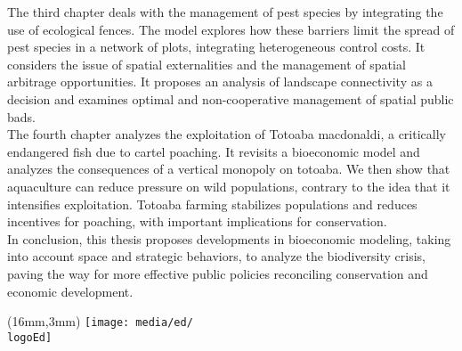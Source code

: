 {The third chapter deals with the management of pest species by integrating the use of ecological fences. The model explores how these barriers limit the spread of pest species in a network of plots, integrating heterogeneous control costs. It considers the issue of spatial externalities and the management of spatial arbitrage opportunities. It proposes an analysis of landscape connectivity as a decision and examines optimal and non-cooperative management of spatial public bads. \\

The fourth chapter analyzes the exploitation of Totoaba macdonaldi, a critically endangered fish due to cartel poaching. It revisits a bioeconomic model and analyzes the consequences of a vertical monopoly on totoaba. We then show that aquaculture can reduce pressure on wild populations, contrary to the idea that it intensifies exploitation. Totoaba farming stabilizes populations and reduces incentives for poaching, with important implications for conservation.\\

In conclusion, this thesis proposes developments in bioeconomic modeling, taking into account space and strategic behaviors, to analyze the biodiversity crisis, paving the way for more effective public policies reconciling conservation and economic development.


}															%

\label{layout_last}

\pagestyle{empty}

\begin{textblock*}{61mm}(16mm,3mm)
	\noindent\texttt{[image: media/ed/\\logoEd]}
\end{textblock*}



